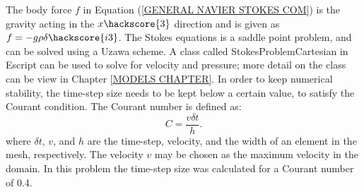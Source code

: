 %
The body force $f$ in Equation (\ref{GENERAL NAVIER STOKES COM}) is the gravity acting in the $x\hackscore{3}$ direction and is given as $f = -g \rho \delta\hackscore{i3}$.
The Stokes equations is a saddle point problem, and can be solved using a Uzawa scheme. A class called StokesProblemCartesian in Escript can be used to solve for velocity and pressure; more detail on the class can be view in Chapter \ref{MODELS CHAPTER}.
In order to keep numerical stability, the time-step size needs to be kept below a certain value, to satisfy the Courant condition. The Courant number is defined as:
%
\begin{equation}
C = \frac{v \delta t}{h}.
\label{COURANT}
\end{equation}
%
where $\delta t$, $v$, and $h$ are the time-step, velocity, and the width of an element in the mesh, respectively. The velocity $v$ may be chosen as the maximum velocity in the domain. In this problem the time-step size was calculated for a Courant number of 0.4.

